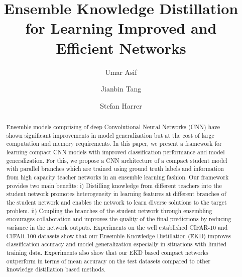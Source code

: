 \documentclass{ecai}
\title{Ensemble Knowledge Distillation for Learning Improved and Efficient Networks}
\author{Umar Asif \institute{IBM Research Australia, email: umarasif@au1.ibm.com} \and Jianbin Tang \institute{IBM Research Australia, email: jbtang@au1.ibm.com} \and Stefan Harrer\institute{IBM Research Australia, email: sharrer@au1.ibm.com}}
\begin{document}
\maketitle
\begin{abstract}
Ensemble models comprising of deep Convolutional Neural Networks (CNN) have shown significant improvements in model generalization but at the cost of large computation and memory requirements. 
In this paper, we present a framework for learning compact CNN models with improved classification performance and model generalization. For this, we propose a CNN architecture of a compact student model with parallel branches which are trained using ground truth labels and information from high capacity teacher networks in an ensemble learning fashion. Our framework provides two main benefits: i) Distilling knowledge from different teachers into the student network promotes heterogeneity in  learning features at different branches of the student network and enables the network to learn diverse solutions to the target problem. ii) Coupling the branches of the student network through ensembling encourages collaboration and improves the quality of the final predictions by reducing variance in the network outputs.
Experiments on the well established CIFAR-10 and CIFAR-100 datasets show that our Ensemble Knowledge Distillation (EKD) improves classification accuracy and model generalization especially in situations with limited training data. Experiments also show that our EKD based compact networks outperform in terms of mean accuracy on the test datasets compared to other knowledge distillation based methods.
\end{abstract}
\end{document}
